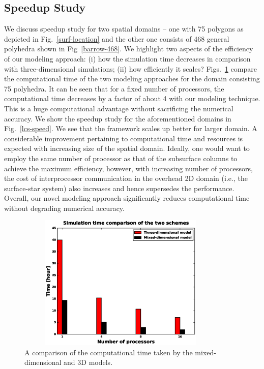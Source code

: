 \documentclass[review]{elsarticle}
\begin{document}

\subsection{Speedup Study}
We discuss speedup study for two spatial domains -- one with 75 polygons as depicted in Fig.~\ref{surf-location} and the other one consists of 468 general polyhedra shown in Fig~\ref{barrow-468}. We highlight two aspects of the efficiency of our modeling approach: (i) how the simulation time decreases in comparison with three-dimensional simulations; (ii) how efficiently it scales? Figs.~\ref{3d-lcs-speed} compare the computational time of the two modeling approaches for the domain consisting 75 polyhedra.
It can be seen that for a fixed number of processors, the computational time decreases by a factor of about 4 with our modeling technique. This is a huge computational advantage without sacrificing the numerical accuracy. We show the speedup study for the aforementioned domains in Fig.~\ref{lcs-speed}. We see that the framework scales up better for larger domain. A considerable improvement pertaining to computational time and resources is expected with increasing size of the spatial domain. Ideally, one would want to employ the same number of processor as that of the subsurface columns to achieve the maximum efficiency, however, with increasing number of processors, the cost of interprocessor communication in the overhead 2D domain (i.e., the surface-star system) also increases and hence supersedes the performance. Overall, our novel modeling approach significantly reduces computational time without degrading numerical accuracy.


\begin{figure}[!htpb]
\centering
\includegraphics[height = 6.5cm, width=10cm]{figures/compare3d-lcs-speed.eps}
\caption{A comparison of the computational time taken by the mixed-dimensional and 3D models.}
\label{3d-lcs-speed}
\end{figure}
\end{document}

